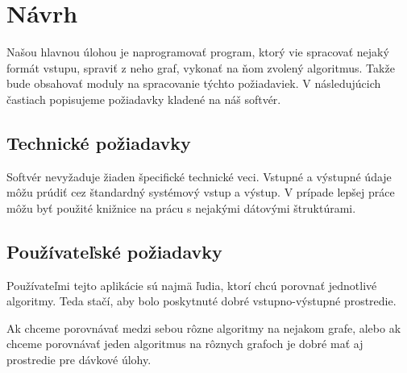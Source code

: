 
\section{Návrh}

Našou hlavnou úlohou je naprogramovať program, ktorý vie spracovať nejaký 
formát vstupu, spraviť z neho graf, vykonať na ňom zvolený algoritmus. Takže 
bude obsahovať moduly na spracovanie týchto požiadaviek. V následujúcich 
častiach popisujeme požiadavky kladené na náš softvér.


\subsection{Technické požiadavky}

Softvér nevyžaduje žiaden špecifické technické veci. Vstupné a výstupné údaje 
môžu prúdiť cez štandardný systémový vstup a výstup. V prípade lepšej práce 
môžu byť použité knižnice na prácu s nejakými dátovými štruktúrami.

\subsection{Používateľské požiadavky}

Používateľmi tejto aplikácie sú najmä ľudia, ktorí chcú porovnať jednotlivé 
algoritmy. Teda stačí, aby bolo poskytnuté dobré vstupno-výstupné prostredie.

Ak chceme porovnávať medzi sebou rôzne algoritmy na nejakom grafe, alebo ak 
chceme porovnávať jeden algoritmus na rôznych grafoch je dobré mať aj 
prostredie pre dávkové úlohy.

